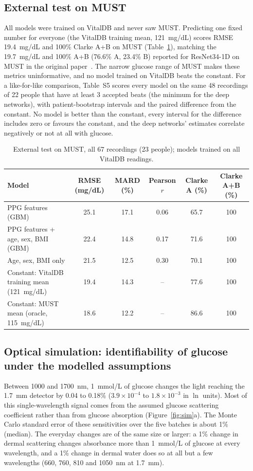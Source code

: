 \documentclass[11pt]{article}
\newcommand{\mgdl}{mg/dL}
\begin{document}
\subsection{External test on MUST}
\label{sec:must}
All models were trained on VitalDB and never saw MUST. Predicting one fixed number for everyone (the VitalDB training mean, 121~\mgdl{}) scores RMSE 19.4~\mgdl{} and 100\% Clarke A+B on MUST (Table~\ref{tab:must}), matching the 19.7~\mgdl{} and 100\% A+B (76.6\% A, 23.4\% B) reported for ResNet34-1D on MUST in the original paper~\citep{zeynali2025}. The narrow glucose range of MUST makes these metrics uninformative, and no model trained on VitalDB beats the constant. For a like-for-like comparison, Table~S5 scores every model on the same 48 recordings of 22 people that have at least 3 accepted beats (the minimum for the deep networks), with patient-bootstrap intervals and the paired difference from the constant. No model is better than the constant, every interval for the difference includes zero or favours the constant, and the deep networks' estimates correlate negatively or not at all with glucose.



\begin{table}[!htbp]
\centering\footnotesize\setlength{\tabcolsep}{3.2pt}
\caption{External test on MUST, all 67 recordings (23 people); models trained on all VitalDB readings.}
\label{tab:must}
\begin{tabular}{@{}lccccc@{}}
\toprule
Model & RMSE (\mgdl{}) & MARD (\%) & Pearson $r$ & Clarke A (\%) & Clarke A+B (\%) \\
\midrule
PPG features (GBM) & 25.1 & 17.1 & 0.06 & 65.7 & 100 \\
PPG features + age, sex, BMI (GBM) & 22.4 & 14.8 & 0.17 & 71.6 & 100 \\
Age, sex, BMI only & 21.5 & 12.5 & 0.30 & 70.1 & 100 \\
Constant: VitalDB training mean (121~\mgdl{}) & 19.4 & 14.3 & -- & 77.6 & 100 \\
Constant: MUST mean (oracle, 115~\mgdl{}) & 18.6 & 12.2 & -- & 86.6 & 100 \\
\bottomrule
\end{tabular}
\end{table}


\FloatBarrier
\subsection{Optical simulation: identifiability of glucose under the modelled assumptions}
\label{sec:simres}
Between 1000 and 1700~nm, 1~mmol/L of glucose changes the light reaching the 1.7~mm detector by 0.04 to 0.18\% ($3.9\times10^{-4}$ to $1.8\times10^{-3}$ in $\ln$ units). Most of this single-wavelength signal comes from the assumed glucose scattering coefficient rather than from glucose absorption (Figure~\ref{fig:sim}a). The Monte Carlo standard error of these sensitivities over the five batches is about 1\% (median). The everyday changes are of the same size or larger: a 1\% change in dermal scattering changes absorbance more than 1~mmol/L of glucose at every wavelength, and a 1\% change in dermal water does so at all but a few wavelengths (660, 760, 810 and 1050~nm at 1.7~mm).
\end{document}
